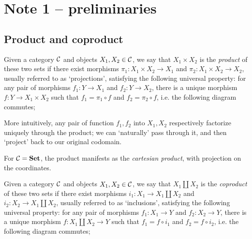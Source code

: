 
\section{Note 1 -- preliminaries}

\subsection{Product and coproduct}

\begin{definition}[Product]
	Given a category $\mathcal{C}$ and objects $X_1,X_2\in\mathcal{C}$, we say that $X_1\times X_2$ is the \emph{product} of these two sets if there exist morphisms $\pi_1:X_1\times X_2 \to X_1$ and $\pi_2:X_1\times X_2\to X_2$, usually referred to as `projections', satisfying the following universal property: for any pair of morphisms $f_1:Y\to X_1$ and $f_2:Y\to X_2$, there is a unique morphism $f:Y\to X_1\times X_2$ such that $f_1=\pi_1 \circ f$ and $f_2=\pi_2 \circ f$, i.e. the following diagram commutes;

	\begin{figure}[!ht]
	\centering
	\end{figure}
\end{definition}

More intuitively, any pair of function $f_1,f_2$ into $X_1,X_2$ respectively factorize uniquely through the product; we can `naturally' pass through it, and then `project' back to our original codomain.

For $\mathcal{C}=\mathbf{Set}$, the product manifests as the \emph{cartesian product}, with projection on the coordinates.

\begin{definition}[Coproduct]
	Given a category $\mathcal{C}$ and objects $X_1,X_2\in\mathcal{C}$, we say that $X_1\coprod X_2$ is the \emph{coproduct} of these two sets if there exist morphisms $i_1:X_1\to X_1\coprod X_2$ and $i_2:X_2\to X_1\coprod X_2$, usually referred to as `inclusions', satisfying the following universal property: for any pair of morphisms $f_1:X_1\to Y$ and $f_2:X_2\to Y$, there is a unique morphism $f:X_1\coprod X_2\to Y$ such that $f_1=f\circ i_1$ and $f_2=f\circ i_2$, i.e. the following diagram commutes;

	\begin{figure}[ht!]
	\centering
	\end{figure}
\end{definition}

